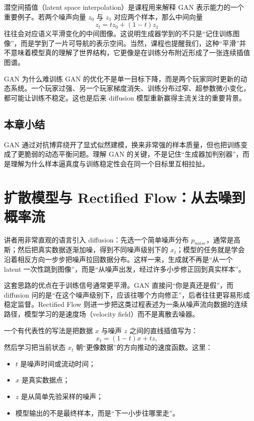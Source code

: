 \documentclass[a4paper]{article}
\begin{document}
    潜空间插值（latent space interpolation）是课程用来解释 GAN 表示能力的一个重要例子。若两个噪声向量 $z_0$ 与 $z_1$ 对应两个样本，那么中间向量
    \[
    z_t = t z_0 + (1-t) z_1
    \]
    往往会对应语义平滑变化的中间图像。这说明生成器学到的不只是“记住训练图像”，而是学到了一片可导航的表示空间。当然，课程也提醒我们，这种“平滑”并不意味着模型真的理解了世界结构，它更像是在训练分布附近形成了一张连续插值图谱。

    \begin{warningbox}{GAN 为什么难训练}
    GAN 的优化不是单一目标下降，而是两个玩家同时更新的动态系统。一个玩家过强、另一个玩家梯度消失、训练分布过窄、超参数微小变化，都可能让训练不稳定。这也是后来 diffusion 模型重新赢得主流关注的重要背景。
    \end{warningbox}

    \subsection{本章小结}

    GAN 通过对抗博弈绕开了显式似然建模，换来非常强的样本质量，但也把训练变成了更脆弱的动态平衡问题。理解 GAN 的关键，不是记住“生成器加判别器”，而是理解为什么样本逼真度与训练稳定性会在同一个目标里互相拉扯。

    \section{扩散模型与 Rectified Flow：从去噪到概率流}

    讲者用非常直观的语言引入 diffusion：先选一个简单噪声分布 $p_{noise}$，通常是高斯；然后把真实数据逐渐加噪，得到不同噪声级别下的 $x_t$；模型的任务就是学会沿着相反方向一步步把噪声拉回数据分布。这样一来，生成就不再是“从一个 latent 一次性跳到图像”，而是“从噪声出发，经过许多小步修正回到真实样本”。

    这套思路的优点在于训练信号通常更平滑。GAN 直接问“你是真还是假”，而 diffusion 问的是“在这个噪声级别下，应该往哪个方向修正”，后者往往更容易形成稳定监督。Rectified Flow 则进一步把这类过程表述为一条从噪声流向数据的连续路径，模型学习的是速度场（velocity field）而不是离散去噪器。

    一个有代表性的写法是把数据 $x$ 与噪声 $z$ 之间的直线插值写为：
    \[
    x_t = (1-t)x + tz,
    \]
    然后学习把当前状态 $x_t$ 朝“更像数据”的方向推动的速度函数。这里：
    \begin{itemize}
    \item $t$ 是噪声时间或流动时间；
    \item $x$ 是真实数据点；
    \item $z$ 是从简单先验采样的噪声；
    \item 模型输出的不是最终样本，而是“下一小步往哪里走”。
    \end{itemize}
\end{document}
